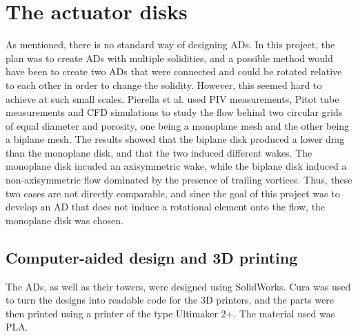 \section{The actuator disks}
As mentioned, there is no standard way of designing \gls{AD}s. In this project, the plan was to create \gls{AD}s with multiple solidities, and a possible method would have been to create two \gls{AD}s that were connected and could be rotated relative to each other in order to change the solidity. However, this seemed hard to achieve at such small scales. Pierella et al. \cite{Pierella2010} used \gls{PIV} measurements, Pitot tube measurements and \gls{CFD} simulations to study the flow behind two circular grids of equal diameter and porosity, one being a monoplane mesh and the other being a biplane mesh. The results showed that the biplane disk produced a lower drag than the monoplane disk, and that the two induced different wakes. The monoplane disk incuded an axisymmetric wake, while the biplane disk induced a non-axisymmetric flow dominated by the presence of trailing vortices. Thus, these two cases are not directly comparable, and since the goal of this project was to develop an \gls{AD} that does not induce a rotational element onto the flow, the monoplane disk was chosen. 





 

\subsection{Computer-aided design and 3D printing}
The \gls{AD}s, as well as their towers, were designed using SolidWorks. Cura was used to turn the designs into readable code for the 3D printers, and the parts were then printed using a printer of the type Ultimaker 2+. The material used was PLA.

